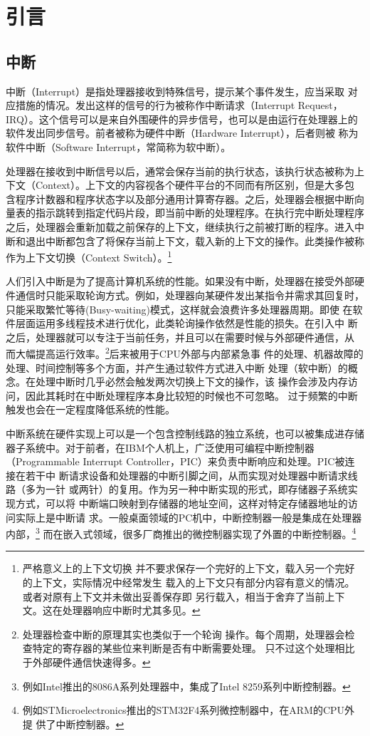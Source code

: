
\chapter{引言}
\label{cha:intro}

\section{中断}
\label{sec:intr}
中断（Interrupt）是指处理器接收到特殊信号，提示某个事件发生，应当采取
对应措施的情况。发出这样的信号的行为被称作中断请求（Interrupt Request，
IRQ）。这个信号可以是来自外围硬件的异步信号，也可以是由运行在处理器上的
软件发出同步信号。前者被称为硬件中断（Hardware Interrupt），后者则被
称为软件中断（Software Interrupt，常简称为软中断）。

处理器在接收到中断信号以后，通常会保存当前的执行状态，该执行状态被称为上
下文（Context）。上下文的内容视各个硬件平台的不同而有所区别，但是大多包
含程序计数器和程序状态字以及部分通用计算寄存器。之后，处理器会根据中断向
量表的指示跳转到指定代码片段，即当前中断的处理程序。在执行完中断处理程序
之后，处理器会重新加载之前保存的上下文，继续执行之前被打断的程序。进入中
断和退出中断都包含了将保存当前上下文，载入新的上下文的操作。此类操作被称
作为上下文切换（Context Switch）。\footnote{严格意义上的上下文切换
并不要求保存一个完好的上下文，载入另一个完好的上下文，实际情况中经常发生
载入的上下文只有部分内容有意义的情况。或者对原有上下文并未做出妥善保存即
另行载入，相当于舍弃了当前上下文。这在处理器响应中断时尤其多见。}

人们引入中断是为了提高计算机系统的性能。如果没有中断，处理器在接受外部硬
件通信时只能采取轮询方式。例如，处理器向某硬件发出某指令并需求其回复时，
只能采取繁忙等待(Busy-waiting)模式，这样就会浪费许多处理器周期。即使
在软件层面运用多线程技术进行优化，此类轮询操作依然是性能的损失。在引入中
断之后，处理器就可以专注于当前任务，并且可以在需要时候与外部硬件通信，从
而大幅提高运行效率。\footnote{处理器检查中断的原理其实也类似于一个轮询
操作。每个周期，处理器会检查特定的寄存器的某些位来判断是否有中断需要处理。
只不过这个处理相比于外部硬件通信快速得多。}后来被用于CPU外部与内部紧急事
件的处理、机器故障的处理、时间控制等多个方面，并产生通过软件方式进入中断
处理（软中断）的概念。在处理中断时几乎必然会触发两次切换上下文的操作，该
操作会涉及内存访问，因此其耗时在中断处理程序本身比较短的时候也不可忽略。
过于频繁的中断触发也会在一定程度降低系统的性能。

中断系统在硬件实现上可以是一个包含控制线路的独立系统，也可以被集成进存储
器子系统中。对于前者，在IBM个人机上，广泛使用可编程中断控制器（Programmable 
Interrupt Controller，PIC）来负责中断响应和处理。PIC被连接在若干中
断请求设备和处理器的中断引脚之间，从而实现对处理器中断请求线路（多为一针
或两针）的复用。作为另一种中断实现的形式，即存储器子系统实现方式，可以将
中断端口映射到存储器的地址空间，这样对特定存储器地址的访问实际上是中断请
求。一般桌面领域的PC机中，中断控制器一般是集成在处理器内部，\footnote{
例如Intel推出的8086A系列处理器中，集成了Intel 8259系列中断控制器。}
而在嵌入式领域，很多厂商推出的微控制器实现了外置的中断控制器。\footnote{
例如STMicroelectronics推出的STM32F4系列微控制器中，在ARM的CPU外提
供了中断控制器。}

